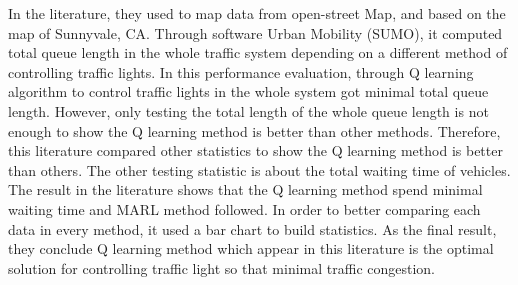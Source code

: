 \documentclass[draftclsnofoot,onecolumn]{IEEEtran}
\begin{document}
In the literature, they used to map data from open-street Map, and based on the map of Sunnyvale, CA. Through software Urban Mobility (SUMO), it computed total queue length in the whole traffic system depending on a different method of controlling traffic lights. In this performance evaluation, through Q learning algorithm to control traffic lights in the whole system got minimal total queue length. However, only testing the total length of the whole queue length is not enough to show the Q learning method is better than other methods. Therefore, this literature compared other statistics to show the Q learning method is better than others. The other testing statistic is about the total waiting time of vehicles. The result in the literature shows that the Q learning method spend minimal waiting time and MARL method followed. In order to better comparing each data in every method, it used a bar chart to build statistics. As the final result, they conclude Q learning method which appear in this literature is the optimal solution for controlling traffic light so that minimal traffic congestion.
\end{document}
